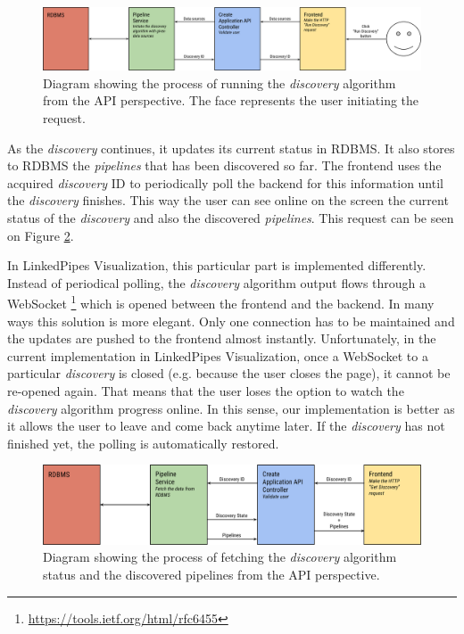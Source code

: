 \begin{figure}
	\centering
	\includegraphics[width=140mm]{img/04_api_run_discovery_diagram.png}
	\caption{Diagram showing the process of running the \emph{discovery} algorithm from the API perspective. The face represents the user initiating the request.} 
	\label{fig:api-run-discovery-diagram}
\end{figure}

As the \emph{discovery} continues, it updates its current status in RDBMS. It also stores to RDBMS the \emph{pipelines} that has been discovered so far. The frontend uses the acquired \emph{discovery} ID to periodically poll the backend for this information until the \emph{discovery} finishes. This way the user can see online on the screen the current status of the \emph{discovery} and also the discovered \emph{pipelines}. This request can be seen on Figure \ref{fig:api-get-discovery-diagram}.

In LinkedPipes Visualization, this particular part is implemented differently. Instead of periodical polling, the \emph{discovery} algorithm output flows through a WebSocket \footnote{\url{https://tools.ietf.org/html/rfc6455}} which is opened between the frontend and the backend. In many ways this solution is more elegant. Only one connection has to be maintained and the updates are pushed to the frontend almost instantly. Unfortunately, in the current implementation in LinkedPipes Visualization, once a WebSocket to a particular \emph{discovery} is closed (e.g. because the user closes the page), it cannot be re-opened again. That means that the user loses the option to watch the \emph{discovery} algorithm progress online. In this sense, our implementation is better as it allows the user to leave and come back anytime later. If the \emph{discovery} has not finished yet, the polling is automatically restored.
\begin{figure}
	\centering
	\includegraphics[width=140mm]{img/04_api_get_discovery_diagram.png}
	\caption{Diagram showing the process of fetching the \emph{discovery} algorithm status and the discovered pipelines from the API perspective.} 
	\label{fig:api-get-discovery-diagram}
\end{figure}





